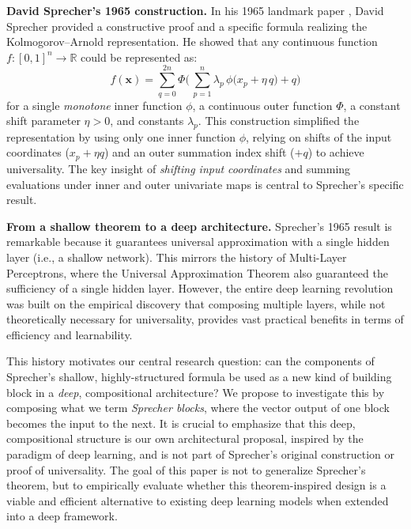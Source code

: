 \documentclass{article}
\theoremstyle{plain}
\theoremstyle{definition}
\theoremstyle{remark}
\begin{document}
\vspace{1mm}
\textbf{David Sprecher's 1965 construction.} In his 1965 landmark paper \cite{sprecher1965}, David Sprecher provided a constructive proof and a specific formula realizing the Kolmogorov--Arnold representation. He showed that any continuous function $f:[0,1]^n \to \mathbb{R}$ could be represented as:
\begin{equation}\label{eq:sprecher_original}
f(\mathbf{x})=\sum_{q=0}^{2n}\Phi\Biggl(\,\sum_{p=1}^{n}\lambda_p\,\phi\bigl(x_p+\eta\,q\bigr)+q\Biggr)
\end{equation}
for a single \emph{monotone} inner function $\phi$, a continuous outer function $\Phi$, a constant shift parameter $\eta > 0$, and constants $\lambda_p$. This construction simplified the representation by using only one inner function $\phi$, relying on shifts of the input coordinates ($x_p + \eta q$) and an outer summation index shift ($+q$) to achieve universality. The key insight of \emph{shifting input coordinates} and summing evaluations under inner and outer univariate maps is central to Sprecher's specific result.

\vspace{1mm}
\textbf{From a shallow theorem to a deep architecture.} Sprecher's 1965 result is remarkable because it guarantees universal approximation with a single hidden layer (i.e., a shallow network). This mirrors the history of Multi-Layer Perceptrons, where the Universal Approximation Theorem also guaranteed the sufficiency of a single hidden layer. However, the entire deep learning revolution was built on the empirical discovery that composing multiple layers, while not theoretically necessary for universality, provides vast practical benefits in terms of efficiency and learnability.

This history motivates our central research question: can the components of Sprecher's shallow, highly-structured formula be used as a new kind of building block in a \emph{deep}, compositional architecture? We propose to investigate this by composing what we term \emph{Sprecher blocks}, where the vector output of one block becomes the input to the next. It is crucial to emphasize that this deep, compositional structure is our own architectural proposal, inspired by the paradigm of deep learning, and is not part of Sprecher's original construction or proof of universality. The goal of this paper is not to generalize Sprecher's theorem, but to empirically evaluate whether this theorem-inspired design is a viable and efficient alternative to existing deep learning models when extended into a deep framework.
\end{document}
